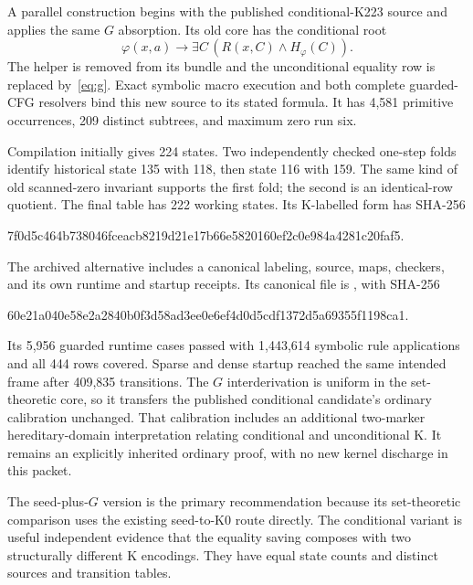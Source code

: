 A parallel construction begins with the published conditional-K223
source and applies the same $G$ absorption. Its old core has the
conditional root
\[
      \varphi(x,a)\to\exists C\,(R(x,C)\land H_\varphi(C)).
\]
The helper is removed from its bundle and the unconditional equality
row is replaced by~\eqref{eq:g}. Exact symbolic macro execution and
both complete guarded-CFG resolvers bind this new source to its stated
formula. It has 4,581 primitive occurrences, 209 distinct subtrees,
and maximum zero run six.

Compilation initially gives 224 states. Two independently checked
one-step folds identify historical state 135 with 118, then state 116
with 159. The same kind of old scanned-zero invariant supports the
first fold; the second is an identical-row quotient. The final table
has 222 working states. Its K-labelled form has SHA-256
\begin{center}\small\ttfamily
7f0d5c464b738046fceacb8219d21e17b66e5820160ef2c0e984a4281c20faf5.
\end{center}
The archived alternative includes a canonical labeling, source, maps,
checkers, and its own runtime and startup receipts. Its canonical file is
, with SHA-256
\begin{center}\small\ttfamily
60e21a040e58e2a2840b0f3d58ad3ee0e6ef4d0d5cdf1372d5a69355f1198ca1.
\end{center}

Its 5,956 guarded runtime cases passed with 1,443,614 symbolic rule
applications and all 444 rows covered. Sparse and dense startup
reached the same intended frame after 409,835 transitions. The $G$
interderivation is uniform in the set-theoretic core, so it transfers
the published conditional candidate's ordinary calibration unchanged.
That calibration includes an additional two-marker hereditary-domain
interpretation relating conditional and unconditional K. It remains
an explicitly inherited ordinary proof, with no new kernel discharge
in this packet.

The seed-plus-$G$ version is the primary recommendation because its
set-theoretic comparison uses the existing seed-to-K0 route directly.
The conditional variant is useful independent evidence that the
equality saving composes with two structurally different K encodings.
They have equal state counts and distinct sources and transition tables.

